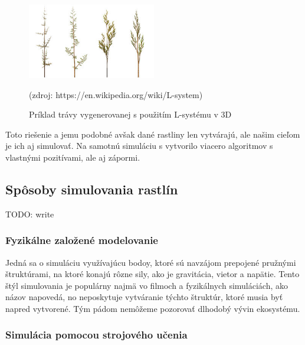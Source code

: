 \documentclass[12pt]{article}
\begin{document}
\begin{figure}[ht]
	\centering
	\includegraphics[width=0.5\textwidth]{res/Fractal_weeds.png}
	\caption{Príklad trávy vygenerovanej s použitím L-systému v 3D}

	\footnotesize (zdroj: https://en.wikipedia.org/wiki/L-system)

	\label{obr:priklad l-systemu}
\end{figure}

Toto riešenie a jemu podobné avšak dané rastliny len
vytvárajú, ale našim cieľom je ich aj simulovať. Na samotnú simuláciu
s vytvorilo viacero algoritmov s vlastnými pozitívami, ale aj zápormi.


\subsection{Spôsoby simulovania rastlín}

TODO: write

\subsubsection{Fyzikálne založené modelovanie}

Jedná sa o simuláciu využívajúcu bodoy, ktoré sú navzájom prepojené pružnými
štruktúrami, na ktoré konajú rôzne sily, ako je gravitácia, vietor
a napätie. Tento štýl simulovania je populárny najmä vo filmoch a fyzikálnych
simuláciách, ako názov napovedá, no neposkytuje vytváranie týchto štruktúr,
ktoré musia byť napred vytvorené. Tým pádom nemôžeme pozorovať dlhodobý
vývin ekosystému.

\subsubsection{Simulácia pomocou strojového učenia}

\end{document}
